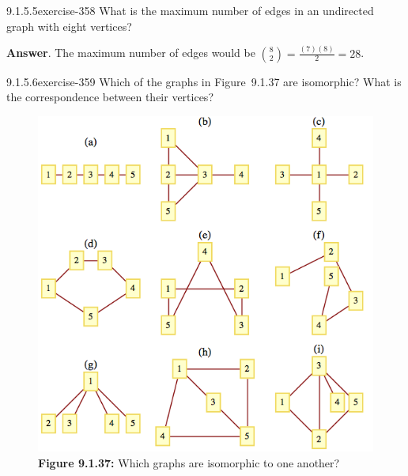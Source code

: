 \documentclass[twoside,10pt,]{book}
\numberwithin{equation}{section}
\begin{document}
\begin{divisionsolution}{9.1.5.5}{}{exercise-358}%
\hypertarget{p-3077}{}%
What is the maximum number of edges in an undirected graph with eight vertices?%
\par\smallskip%
\noindent\textbf{Answer}.\quad%
\hypertarget{p-3078}{}%
The maximum number of edges would be \(\binom{8}{2} = \frac{(7)(8)}{2}=28\).%
\end{divisionsolution}%
\begin{divisionsolution}{9.1.5.6}{}{exercise-359}%
\hypertarget{p-3079}{}%
Which of the graphs in Figure~9.1.37 are isomorphic? What is the correspondence between their vertices?%
\begin{figure}
\centering
\includegraphics[width=1\linewidth]{images/fig-exercise-9-1-6.png}
\caption*{\textbf{Figure 9.1.37:} Which graphs are isomorphic to one another?}
\end{figure}
\end{divisionsolution}%
\end{document}

